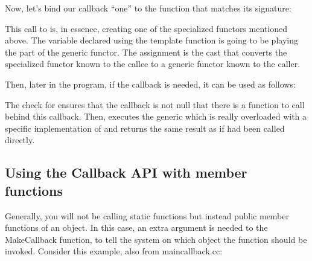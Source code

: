\documentclass[letterpaper,10pt,english]{sphinxmanual}
\renewcommand{\sphinxcode}[1]{\texttt{\small{#1}}}
\begin{document}
Now, let’s bind our callback “one” to the function that matches its signature:

\begin{sphinxVerbatim}[commandchars=\\\{\}]
   
\end{sphinxVerbatim}

This call to \sphinxcode{} is, in essence, creating one of the specialized
functors mentioned above.  The variable declared using the \sphinxcode{}
template function is going to be playing the part of the generic functor.  The
assignment \sphinxcode{} is the cast that converts the
specialized functor known to the callee to a generic functor known to the caller.

Then, later in the program, if the callback is needed, it can be used as follows:

\begin{sphinxVerbatim}[commandchars=\\\{\}]
  

 
    
\end{sphinxVerbatim}

The check for \sphinxcode{} ensures that the callback is not null \textendash{} that there
is a function to call behind this callback.  Then, \sphinxcode{} executes the
generic \sphinxcode{} which is really overloaded with a specific implementation
of \sphinxcode{} and returns the same result as if \sphinxcode{} had been
called directly.


\subsection{Using the Callback API with member functions}
\label{\detokenize{callbacks:using-the-callback-api-with-member-functions}}
Generally, you will not be calling static functions but instead public member
functions of an object.  In this case, an extra argument is needed to the
MakeCallback function, to tell the system on which object the function should be
invoked.  Consider this example, also from main\sphinxhyphen{}callback.cc:
\end{document}
